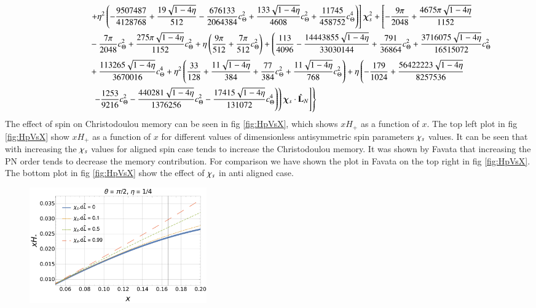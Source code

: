 \documentclass[twocolumn,showpacs,aps,prd,nobibnotes,floatfix]{revtex4-1}
\begin{document}
\begin{widetext}
\begin{subequations}
\begin{align}
	& \qquad\qquad\quad \left.+ \eta^2\left(-\frac{9507487}{4128768} + \frac{19\sqrt{1-4\eta}}{512} - \frac{676133}{2064384}c_{\Theta}^2 +\frac{133\sqrt{1-4\eta}}{4608}c_{\Theta}^2+ \frac{11745}{458752}c_{\Theta}^4\right)\right]\bm{\chi}_s^2 + \left[-\frac{9\pi}{2048} + \frac{4675\pi\sqrt{1-4\eta}}{1152}\right.\nonumber\\
	& \qquad\qquad\quad - \frac{7\pi}{2048}c_{\Theta}^2 + \frac{275\pi\sqrt{1-4\eta}}{1152}c_{\Theta}^2 + \eta\left(\frac{9\pi}{512} + \frac{7\pi}{512}c_{\Theta}^2\right) + \left(\frac{113}{4096} -\frac{14443855\sqrt{1-4\eta}}{33030144} + \frac{791}{36864}c_{\Theta}^2 + \frac{3716075\sqrt{1-4\eta}}{16515072}c_{\Theta}^2\right.\nonumber\\
	 & \qquad\qquad\quad +\frac{113265\sqrt{1-4\eta}}{3670016}c_{\Theta}^4 + \eta^2\left(\frac{33}{128} + \frac{11\sqrt{1-4\eta}}{384} + \frac{77}{384}c_{\Theta}^2 + \frac{11\sqrt{1-4\eta}}{768}c_{\Theta}^2\right) + \eta\left(-\frac{179}{1024} + \frac{56422223\sqrt{1-4\eta}}{8257536}\right.\nonumber\\
	 & \qquad\qquad\quad \left.\left.\left.\left. -\frac{1253}{9216}c_{\Theta}^2 -\frac{440281\sqrt{1-4\eta}}{1376256}c_{\Theta}^2 -\frac{17415\sqrt{1-4\eta}}{131072}c_{\Theta}^4\right)\right)\bm{\chi}_s \cdot \hat{\mathbf{L}}_N\right]\right\}
\end{align}
\end{subequations}
The effect of spin on Christodoulou memory can be seen in fig \ref{fig:HpVsX}, which shows $xH_+$ as a function of $x$. The top left plot in fig \ref{fig:HpVsX} show $xH_+$ as a function of $x$ for different values of dimensionless antisymmetric spin parameters $\chi_s$ values. It can be seen that with increasing the $\chi_s$ values for aligned spin case tends to increase the Christodoulou memory. It was shown by Favata \cite{Favata2009} that increasing the PN order tends to decrease the memory contribution. For comparison we have shown the plot in Favata \cite{Favata2009} on the top right in fig \ref{fig:HpVsX}. The bottom plot in fig \ref{fig:HpVsX} show the effect of $\chi_s$ in anti aligned case.   
\begin{figure}
	\includegraphics[width=3.0in]{../plots/PNmemorycontributionHpAlginedSpin.pdf}

\end{figure}
\end{widetext}
\end{document}
